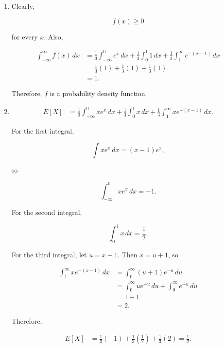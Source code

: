 \documentclass[11pt]{article}
\newenvironment{solution}{
    \par
    \begin{tcolorbox}[
        colback=white,
        colframe=uwgold,
        boxrule=0.7pt,
        arc=2mm,
        left=3mm,
        right=3mm,
        top=2mm,
        bottom=2mm,
        breakable,
        before skip=0.5em,
        after skip=1em,
        title=\textbf{Solution},
        coltitle=uwpurple,
        fonttitle=\bfseries
    ]
}{
    \end{tcolorbox}
}
\begin{document}
\begin{solution}

\begin{enumerate}[label=(\alph*)]

\item Clearly,

\[
f(x)\geq0
\]

for every \(x\). Also,

\begin{align*}
\int_{-\infty}^{\infty}f(x)\,dx
&=
\frac13\int_{-\infty}^{0}e^x\,dx
+
\frac13\int_{0}^{1}1\,dx
+
\frac13\int_{1}^{\infty}e^{-(x-1)}\,dx\\
&=
\frac13(1)
+
\frac13(1)
+
\frac13(1)\\
&=
1.
\end{align*}

Therefore, \(f\) is a probability density function.

\item

\begin{align*}
E[X]
&=
\frac13\int_{-\infty}^{0}xe^x\,dx
+
\frac13\int_{0}^{1}x\,dx
+
\frac13\int_{1}^{\infty}xe^{-(x-1)}\,dx.
\end{align*}

For the first integral,

\[
\int xe^x\,dx=(x-1)e^x,
\]

so

\[
\int_{-\infty}^{0}xe^x\,dx=-1.
\]

For the second integral,

\[
\int_0^1x\,dx=\frac12.
\]

For the third integral, let \(u=x-1\). Then \(x=u+1\), so

\begin{align*}
\int_{1}^{\infty}xe^{-(x-1)}\,dx
&=
\int_{0}^{\infty}(u+1)e^{-u}\,du\\
&=
\int_0^\infty ue^{-u}\,du
+
\int_0^\infty e^{-u}\,du\\
&=
1+1\\
&=
2.
\end{align*}

Therefore,

\begin{align*}
E[X]
&=
\frac13(-1)
+
\frac13\left(\frac12\right)
+
\frac13(2) =  {\frac12}.
\end{align*}

\end{enumerate}

\end{solution}
 
\end{document}
